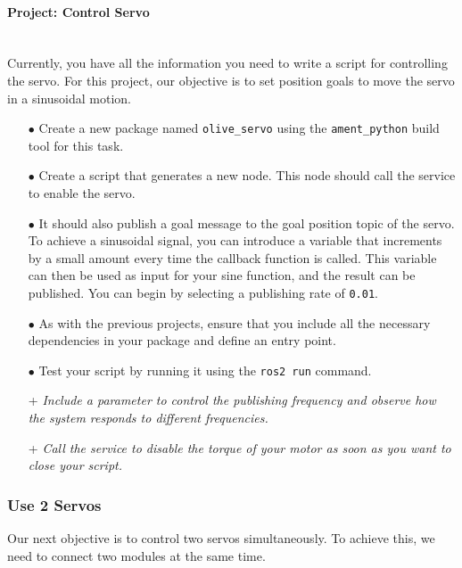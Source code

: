 \documentclass{article}
\begin{document}
\paragraph{Project: Control Servo}~\\
Currently, you have all the information you need to write a script for controlling the servo. For this project, our objective is to set position goals to move the servo in a sinusoidal motion.

\begin{enumerate}
    \item[$\bullet$] Create a new package named \texttt{olive\_servo} using the \texttt{ament\_python} build tool for this task.
    
    \item[$\bullet$] Create a script that generates a new node. This node should call the service to enable the servo.

     \item[$\bullet$] It should also publish a goal message to the goal position topic of the servo. To achieve a sinusoidal signal, you can introduce a variable that increments by a small amount every time the callback function is called. This variable can then be used as input for your sine function, and the result can be published. You can begin by selecting a publishing rate of \texttt{0.01}.
     
     \item[$\bullet$] As with the previous projects, ensure that you include all the necessary dependencies in your package and define an entry point.

     \item[$\bullet$] Test your script by running it using the \texttt{ros2 run} command.

     \item[+] \textit{Include a parameter to control the publishing frequency and observe how the system responds to different frequencies.}

     \item[+] \textit{ Call the service to disable the torque of your motor as soon as you want to close your script.}
\end{enumerate}

\subsubsection{Use 2 Servos}
Our next objective is to control two servos simultaneously. To achieve this, we need to connect two modules at the same time.
\end{document}
